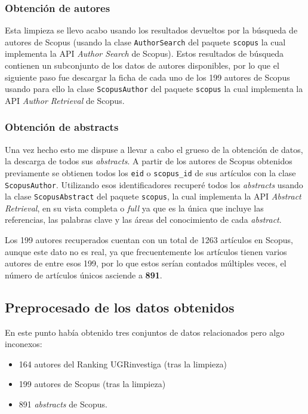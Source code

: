 \subsubsection{Obtención de autores}
Esta limpieza se llevo acabo usando los resultados devueltos por la búsqueda de autores de Scopus (usando la clase \texttt{AuthorSearch} del paquete \texttt{scopus} la cual implementa la \acrshort{API} \textit{Author Search} de Scopus). Estos resultados de búsqueda contienen un subconjunto de los datos de autores disponibles, por lo que el siguiente paso fue descargar la ficha de cada uno de los 199 autores de Scopus usando para ello la clase \texttt{ScopusAuthor} del paquete \texttt{scopus} la cual implementa la \acrshort{API} \textit{Author Retrieval} de Scopus.

\subsubsection{Obtención de abstracts}
Una vez hecho esto me dispuse a llevar a cabo el grueso de la obtención de datos, la descarga de todos sus \textit{abstracts}. A partir de los autores de Scopus obtenidos previamente se obtienen todos los \texttt{eid} o \texttt{scopus\_id} de sus artículos con la clase \texttt{ScopusAuthor}. Utilizando esos identificadores recuperé todos los \textit{abstracts} usando la clase \texttt{ScopusAbstract} del paquete \texttt{scopus}, la cual implementa la \acrshort{API} \textit{Abstract Retrieval}, en su vista completa o \textit{full} \cite{scopusAbstractViews} ya que es la única que incluye las referencias, las palabras clave y las áreas del conocimiento de cada \textit{abstract}.

Los 199 autores recuperados cuentan con un total de 1263 artículos en Scopus, aunque este dato no es real, ya que frecuentemente los artículos tienen varios autores de entre esos 199, por lo que estos serían contados múltiples veces, el número de artículos únicos asciende a \textbf{891}.

\subsection{Preprocesado de los datos obtenidos}
En este punto había obtenido tres conjuntos de datos relacionados pero algo inconexos:
\begin{itemize}
	\item 164 autores del Ranking UGRinvestiga (tras la limpieza)
	\item 199 autores de Scopus (tras la limpieza)
	\item 891 \textit{abstracts} de Scopus. 
\end{itemize}

